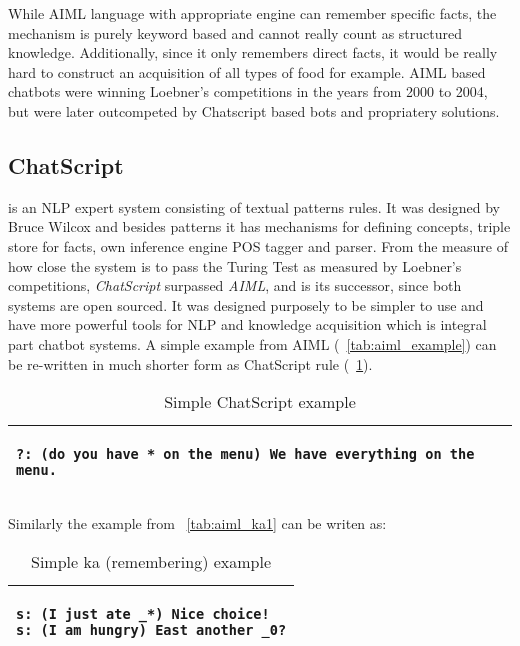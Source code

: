 While AIML language with appropriate engine can remember specific facts, the
mechanism is purely keyword based and cannot really count as structured knowledge. Additionally, since it only remembers direct facts, it would be
really hard to construct an acquisition of all types of food for example.
AIML based chatbots were winning Loebner's competitions in the years from 2000
to 2004, but were later outcompeted by Chatscript based bots and propriatery 
solutions.

\subsection {ChatScript} is an NLP expert system consisting of textual patterns 
rules. It was designed by Bruce Wilcox \parencite{Wilcox2011} and besides
patterns it has mechanisms for defining concepts, triple store for facts, 
own inference engine POS tagger and parser. From the measure of how close the system is to pass the Turing Test as measured by Loebner's competitions, \emph{ChatScript} surpassed \emph{AIML},
and is its successor, since both systems are open sourced. It was designed 
purposely to be simpler to use and have more powerful tools for NLP and knowledge acquisition which is integral part chatbot systems. A simple example
from AIML (\tablename~\ref{tab:aiml_example}) can be re-written in much shorter form as ChatScript rule (\tablename~\ref{tab:chatscript_example}).

\begin{table}[htb]
	\caption{Simple ChatScript example}
	\label{tab:chatscript_example}
	\centering
	\begin{tabular}{l}
		\hline
		\lstset{breaklines=true}
		\begin{lstlisting}
?: (do you have * on the menu) We have everything on the menu.
		\end{lstlisting}  \\
		\hline
	\end{tabular}
\end{table}

Similarly the example from \tablename~\ref{tab:aiml_ka1} can be writen as:
\begin{table}[htb]
	\caption{Simple ka (remembering) example}
	\label{tab:chatscript_ka1}
	\centering
	\begin{tabular}{l}
		\hline
		\lstset{breaklines=true}
		\begin{lstlisting}
s: (I just ate _*) Nice choice!
s: (I am hungry) East another _0?
		\end{lstlisting}  \\
		\hline
	\end{tabular}
\end{table}


